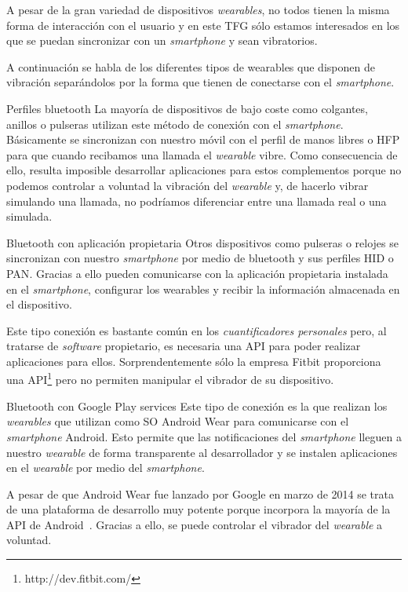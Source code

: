 A pesar de la gran variedad de dispositivos \emph{wearables}, no todos tienen la misma forma de
interacción con el usuario y en este \acs{TFG} sólo estamos interesados en los que se puedan
sincronizar con un \emph{smartphone} y sean vibratorios.

A continuación se habla de los diferentes tipos de wearables que disponen de vibración separándolos
por la forma que tienen de conectarse con el \emph{smartphone}.

\begin{definitionlist}
  \item[Perfiles bluetooth] La mayoría de dispositivos de bajo coste como colgantes, anillos o
    pulseras utilizan este método de conexión con el \emph{smartphone}. Básicamente se sincronizan
    con nuestro móvil con el perfil de manos libres o \acf{HFP} para que cuando recibamos una
    llamada el \emph{wearable} vibre. Como consecuencia de ello, resulta imposible desarrollar
    aplicaciones para estos complementos porque no podemos controlar a voluntad la vibración del
    \emph{wearable} y, de hacerlo vibrar simulando una llamada, no podríamos diferenciar entre una
    llamada real o una simulada.

  \item[Bluetooth con aplicación propietaria] Otros dispositivos como pulseras o relojes se
    sincronizan con nuestro \emph{smartphone} por medio de bluetooth y sus perfiles \acf{HID} o
    \acf{PAN}. Gracias a ello pueden comunicarse con la aplicación propietaria instalada en el
    \emph{smartphone}, configurar los wearables y recibir la información almacenada en el
    dispositivo.

    Este tipo conexión es bastante común en los \emph{cuantificadores personales} pero, al tratarse
    de \emph{software} propietario, es necesaria una \acs{API} para poder realizar aplicaciones para
    ellos. Sorprendentemente sólo la empresa Fitbit proporciona una
    \acs{API}\footnote{http://dev.fitbit.com/} pero no permiten manipular el vibrador de su
    dispositivo.

  \item[Bluetooth con Google Play services] Este tipo de conexión es la que realizan los
    \emph{wearables} que utilizan como \acs{SO} Android Wear para comunicarse con el
    \emph{smartphone} Android. Esto permite que las notificaciones del \emph{smartphone} lleguen a
    nuestro \emph{wearable} de forma transparente al desarrollador y se instalen aplicaciones en el
    \emph{wearable} por medio del \emph{smartphone}.

    A pesar de que Android Wear fue lanzado por Google en marzo de 2014 se trata de una plataforma
    de desarrollo muy potente porque incorpora la mayoría de la \acs{API} de
    Android~\cite{APIAW}. Gracias a ello, se puede controlar el vibrador del \emph{wearable} a
    voluntad.
 
\end{definitionlist}

